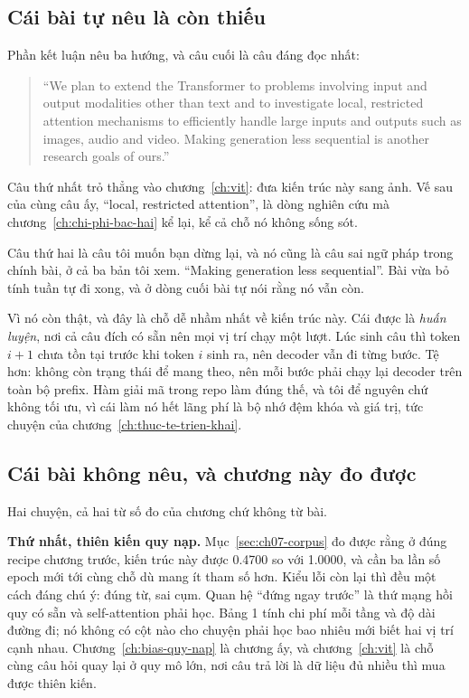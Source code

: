 \subsection*{Cái bài tự nêu là còn thiếu}

%
Phần kết luận nêu ba hướng, và câu cuối là câu đáng đọc nhất:

\begin{quote}
\enquote{We plan to extend the Transformer to problems involving input and
output modalities other than text and to investigate local, restricted
attention mechanisms to efficiently handle large inputs and outputs such as
images, audio and video. Making generation less sequential is another research
goals of ours.}
\end{quote}

Câu thứ nhất trỏ thẳng vào chương~\ref{ch:vit}: đưa kiến trúc này sang ảnh. Vế
sau của cùng câu ấy, \enquote{local, restricted attention}, là dòng nghiên cứu
mà chương~\ref{ch:chi-phi-bac-hai} kể lại, kể cả chỗ nó không sống sót.

Câu thứ hai là câu tôi muốn bạn dừng lại, và nó cũng là câu sai ngữ pháp trong
chính bài, ở cả ba bản tôi xem. \enquote{Making generation less sequential}.
Bài vừa bỏ tính tuần tự đi xong, và ở dòng cuối bài tự nói rằng nó vẫn còn.

Vì nó còn thật, và đây là chỗ dễ nhầm nhất về kiến trúc này. Cái được
 là \emph{huấn luyện}, nơi cả câu đích có sẵn
nên mọi vị trí chạy một lượt.
Lúc sinh câu thì token \(i+1\) chưa tồn tại trước khi token \(i\) sinh ra, nên
decoder vẫn đi từng bước. Tệ hơn: không còn trạng thái để mang theo, nên mỗi
bước phải chạy lại decoder trên toàn bộ prefix. Hàm giải mã trong repo làm đúng
thế, và tôi để nguyên chứ không tối ưu, vì cái làm nó hết lãng phí là bộ nhớ
đệm khóa và giá trị, tức chuyện của chương~\ref{ch:thuc-te-trien-khai}.

\subsection*{Cái bài không nêu, và chương này đo được}

%
Hai chuyện, cả hai từ số đo của chương chứ không từ bài.

\textbf{Thứ nhất, thiên kiến quy nạp.} Mục~\ref{sec:ch07-corpus} đo được rằng ở
đúng recipe chương trước, kiến trúc này được 0.4700 so với 1.0000, và cần ba
lần số epoch mới tới cùng chỗ dù mang ít tham số hơn. Kiểu lỗi còn lại thì đều
một cách đáng chú ý: đúng từ, sai cụm. Quan hệ \enquote{đứng ngay trước} là thứ
mạng hồi quy có sẵn và self-attention phải học. Bảng 1 tính chi phí mỗi tầng và
độ dài đường đi; nó không có cột nào cho chuyện phải học bao nhiêu mới biết hai
vị trí cạnh nhau. Chương~\ref{ch:bias-quy-nap} là chương ấy, và
chương~\ref{ch:vit} là chỗ cùng câu hỏi quay lại ở quy mô lớn, nơi câu trả lời
là dữ liệu đủ nhiều thì mua được thiên kiến.

